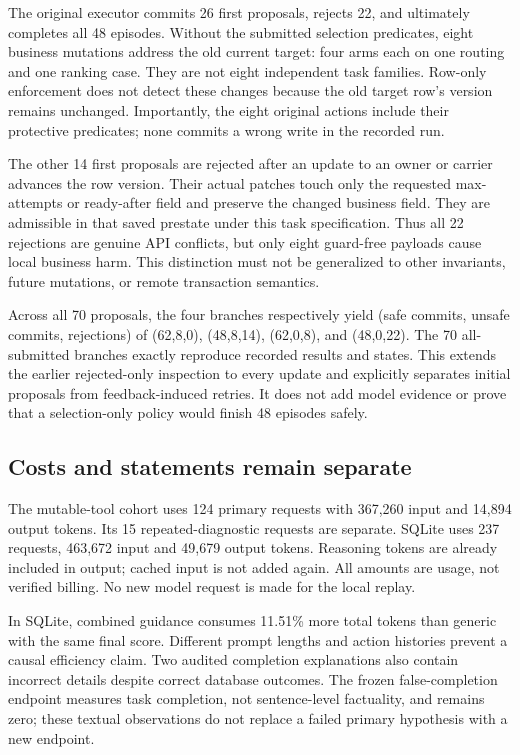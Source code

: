 \documentclass[10pt,letterpaper]{article}
\begin{document}
The original executor commits 26 first proposals, rejects 22, and ultimately completes all 48 episodes. Without the submitted selection predicates, eight business mutations address the old current target: four arms each on one routing and one ranking case. They are not eight independent task families. Row-only enforcement does not detect these changes because the old target row's version remains unchanged. Importantly, the eight original actions include their protective predicates; none commits a wrong write in the recorded run.

The other 14 first proposals are rejected after an update to an owner or carrier advances the row version. Their actual patches touch only the requested max-attempts or ready-after field and preserve the changed business field. They are admissible in that saved prestate under this task specification. Thus all 22 rejections are genuine API conflicts, but only eight guard-free payloads cause local business harm. This distinction must not be generalized to other invariants, future mutations, or remote transaction semantics.

Across all 70 proposals, the four branches respectively yield (safe commits, unsafe commits, rejections) of (62,8,0), (48,8,14), (62,0,8), and (48,0,22). The 70 all-submitted branches exactly reproduce recorded results and states. This extends the earlier rejected-only inspection to every update and explicitly separates initial proposals from feedback-induced retries. It does not add model evidence or prove that a selection-only policy would finish 48 episodes safely.

\subsection{Costs and statements remain separate}
The mutable-tool cohort uses 124 primary requests with 367,260 input and 14,894 output tokens. Its 15 repeated-diagnostic requests are separate. SQLite uses 237 requests, 463,672 input and 49,679 output tokens. Reasoning tokens are already included in output; cached input is not added again. All amounts are usage, not verified billing. No new model request is made for the local replay.

In SQLite, combined guidance consumes 11.51\% more total tokens than generic with the same final score. Different prompt lengths and action histories prevent a causal efficiency claim. Two audited completion explanations also contain incorrect details despite correct database outcomes. The frozen false-completion endpoint measures task completion, not sentence-level factuality, and remains zero; these textual observations do not replace a failed primary hypothesis with a new endpoint.
\end{document}
